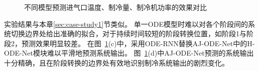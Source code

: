 \begin{figure}
    \caption{不同模型预测进气口温度、制冷量、制冷机功率的效果对比} %
    \label{fig:4_models}  %
    \end{figure}
实验结果与本章\ref{sec:case-study1}节类似。
单一ODE模型时难以对各个阶段间的系统切换边界处给出准确的拟合，对于持续时间较短的阶段转换位置，如阶段1与阶段2，预测效果明显较差。
在图~\ref{fig:4_models}(c)中，采用ODE-RNN替换AJ-ODE-Net中的H-ODE-Net模块难以平滑地预测系统输出。
图~\ref{fig:4_models}(d)中AJ-ODE-Net预测的系统输出十分精确，且在阶段转换的边界处有效地识别制冷系统输出的剧烈变化。

